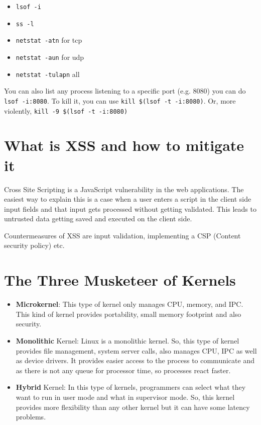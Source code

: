 \begin{itemize}
    \item \texttt{lsof -i}
    \item \texttt{ss -l}
    \item \texttt{netstat -atn} for tcp
    \item \texttt{netstat -aun} for udp
    \item \texttt{netstat -tulapn} all
\end{itemize}

You can also list any process listening to a specific port (e.g. 8080) you can do \texttt{lsof -i:8080}.  To kill it, you can use \texttt{kill \$(lsof -t -i:8080)}.  Or, more violently, \texttt{kill -9 \$(lsof -t -i:8080)}

\section{What is XSS and how to mitigate it}

Cross Site Scripting is a JavaScript vulnerability in the web applications. The easiest way to explain this is a case when a user enters a script in the client side input fields and that input gets processed without getting validated. This leads to untrusted data getting saved and executed on the client side.

Countermeasures of XSS are input validation, implementing a CSP (Content security policy) etc.

\section{The Three Musketeer of Kernels}

\begin{itemize}
    \item \textbf{Microkernel}: This type of kernel only manages CPU, memory, and IPC. This kind of kernel provides portability, small memory footprint and also security.
    
    \item \textbf{Monolithic} Kernel: Linux is a monolithic kernel. So, this type of kernel provides file management, system server calls, also manages CPU, IPC as well as device drivers. It provides easier access to the process to communicate and as there is not any queue for processor time, so processes react faster.
    
    \item \textbf{Hybrid} Kernel: In this type of kernels, programmers can select what they want to run in user mode and what in supervisor mode. So, this kernel provides more flexibility than any other kernel but it can have some latency problems.
\end{itemize}


